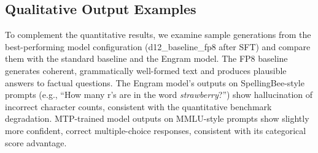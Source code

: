 \subsection{Qualitative Output Examples}

To complement the quantitative results, we examine sample generations from the best-performing
model configuration (d12\_baseline\_fp8 after SFT) and compare them with the standard baseline
and the Engram model.
The FP8 baseline generates coherent, grammatically well-formed text and produces plausible
answers to factual questions.
The Engram model's outputs on SpellingBee-style prompts (e.g., ``How many r's are in the word
\emph{strawberry}?'') show hallucination of incorrect character counts, consistent with the
quantitative benchmark degradation.
MTP-trained model outputs on MMLU-style prompts show slightly more confident, correct
multiple-choice responses, consistent with its categorical score advantage.
